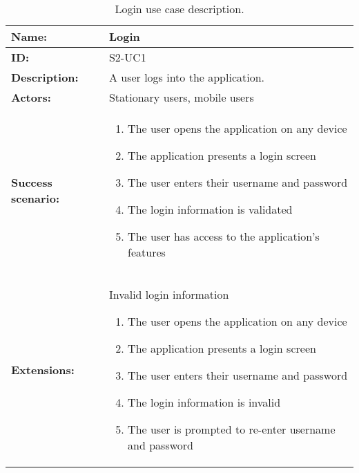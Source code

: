 \begin{table}[h!]
    \centering
    \begin{tabularx}{\textwidth}{lX}
        \toprule
        \textbf{Name:}  & Login \\ \midrule
        \textbf{ID:}    & S2-UC1 \\ \midrule
        \textbf{Description:} & A user logs into the application. \\ \midrule
        \textbf{Actors:} & Stationary users, mobile users \\ \midrule
        \textbf{Success scenario:} & 
        \begin{enumerate}
            \item The user opens the application on any device
            \item The application presents a login screen
            \item The user enters their username and password
            \item The login information is validated
            \item The user has access to the application's features
        \end{enumerate}
        \\ \midrule
        \textbf{Extensions:} & Invalid login information 
        \begin{enumerate}
            \item The user opens the application on any device
            \item The application presents a login screen
            \item The user enters their username and password
            \item The login information is invalid
            \item The user is prompted to re-enter username and password
        \end{enumerate}
        \\ \bottomrule
    \end{tabularx}
    \caption{Login use case description.}
    \label{tab:s2-uc1}
\end{table}

